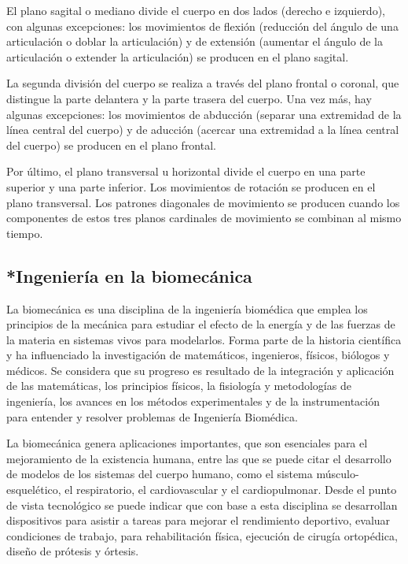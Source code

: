 \documentclass{article}
\begin{document}
El plano sagital o mediano divide el cuerpo en dos lados (derecho e izquierdo), con algunas excepciones: los movimientos de flexión (reducción del ángulo de una articulación o doblar la articulación) y de extensión (aumentar el ángulo de la articulación o extender la articulación) se producen en el plano sagital.

La segunda división del cuerpo se realiza a través del plano frontal o coronal, que distingue la parte delantera y la parte trasera del cuerpo. Una vez más, hay algunas excepciones: los movimientos de abducción (separar una extremidad de la línea central del cuerpo) y de aducción (acercar una extremidad a la línea central del cuerpo) se producen en el plano frontal.

Por último, el plano transversal u horizontal divide el cuerpo en una parte superior y una parte inferior. Los movimientos de rotación se producen en el plano transversal. Los patrones diagonales de movimiento se producen cuando los componentes de estos tres planos cardinales de movimiento se combinan al mismo tiempo. \cite{2}


\subsection{*Ingeniería en la biomecánica}

La biomecánica es una disciplina de la ingeniería biomédica que emplea los principios de la mecánica para estudiar el efecto de la energía y de las fuerzas de la materia en sistemas vivos para modelarlos. 
Forma parte de la historia científica y ha influenciado la investigación de matemáticos, ingenieros, físicos, biólogos y médicos. Se considera que su progreso es resultado de la integración y aplicación de las matemáticas, los principios físicos, la fisiología y metodologías de ingeniería, los avances en los métodos experimentales y de la instrumentación para entender y resolver problemas de Ingeniería Biomédica. 

La biomecánica genera aplicaciones importantes, que son esenciales para el mejoramiento de la existencia humana, entre las que se puede citar el desarrollo de modelos de los sistemas del cuerpo humano, como el sistema músculo-esquelético, el respiratorio, el cardiovascular y el cardiopulmonar. Desde el punto de vista tecnológico se puede indicar que con base a esta disciplina se desarrollan dispositivos para asistir a tareas para mejorar el rendimiento deportivo, evaluar condiciones de trabajo, para rehabilitación física, ejecución de cirugía ortopédica, diseño de prótesis y órtesis. 
\end{document}
